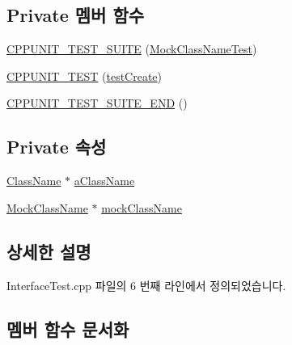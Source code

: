 \subsection*{Private 멤버 함수}
\begin{DoxyCompactItemize}
\item 
\hyperlink{class_mock_class_name_test_ab0ad4bdf130169082eecbf325c78fbd0}{C\+P\+P\+U\+N\+I\+T\+\_\+\+T\+E\+S\+T\+\_\+\+S\+U\+I\+TE} (\hyperlink{class_mock_class_name_test}{Mock\+Class\+Name\+Test})
\item 
\hyperlink{class_mock_class_name_test_accc9eb110693b2619d6b829843ffc966}{C\+P\+P\+U\+N\+I\+T\+\_\+\+T\+E\+ST} (\hyperlink{class_mock_class_name_test_a0dc4c4586e1a48d47ba2b95f5ecd771e}{test\+Create})
\item 
\hyperlink{class_mock_class_name_test_aac6c15d03f8d9865afffc7f091e99053}{C\+P\+P\+U\+N\+I\+T\+\_\+\+T\+E\+S\+T\+\_\+\+S\+U\+I\+T\+E\+\_\+\+E\+ND} ()
\end{DoxyCompactItemize}
\subsection*{Private 속성}
\begin{DoxyCompactItemize}
\item 
\hyperlink{class_class_name}{Class\+Name} $\ast$ \hyperlink{class_mock_class_name_test_a3bb8b721228c57afb0dc7f11ea9f7a95}{a\+Class\+Name}
\item 
\hyperlink{class_mock_class_name}{Mock\+Class\+Name} $\ast$ \hyperlink{class_mock_class_name_test_a1f2ee9faa737933eb0f56751229bd13a}{mock\+Class\+Name}
\end{DoxyCompactItemize}


\subsection{상세한 설명}


Interface\+Test.\+cpp 파일의 6 번째 라인에서 정의되었습니다.



\subsection{멤버 함수 문서화}

